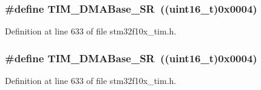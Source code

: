 \subsubsection[{\texorpdfstring{T\+I\+M\+\_\+\+D\+M\+A\+Base\+\_\+\+SR}{TIM_DMABase_SR}}]{\setlength{\rightskip}{0pt plus 5cm}\#define T\+I\+M\+\_\+\+D\+M\+A\+Base\+\_\+\+SR~(({\bf uint16\+\_\+t})0x0004)}\hypertarget{group___t_i_m___d_m_a___base__address_ga5cda07a11a76bbb24a7d5bb680814d31}{}\label{group___t_i_m___d_m_a___base__address_ga5cda07a11a76bbb24a7d5bb680814d31}


Definition at line 633 of file stm32f10x\+\_\+tim.\+h.

\subsubsection[{\texorpdfstring{T\+I\+M\+\_\+\+D\+M\+A\+Base\+\_\+\+SR}{TIM_DMABase_SR}}]{\setlength{\rightskip}{0pt plus 5cm}\#define T\+I\+M\+\_\+\+D\+M\+A\+Base\+\_\+\+SR~(({\bf uint16\+\_\+t})0x0004)}\hypertarget{group___t_i_m___d_m_a___base__address_ga5cda07a11a76bbb24a7d5bb680814d31}{}\label{group___t_i_m___d_m_a___base__address_ga5cda07a11a76bbb24a7d5bb680814d31}


Definition at line 633 of file stm32f10x\+\_\+tim.\+h.

